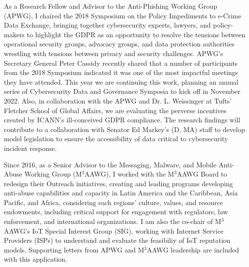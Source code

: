\documentclass[11pt]{letter}
\begin{document}
\begin{letter}
%
%
As a Research Fellow and Advisor to the Anti-Phishing Working Group (APWG), I chaired the 2018 Symposium on the Policy Impediments to e-Crime Data Exchange, bringing together cybersecurity experts,
lawyers, and policy-makers to highlight the GDPR as an opportunity to resolve the tensions between operational security groups, advocacy groups, and data protection authorities wrestling with tensions between privacy and security challenges.
%
APWG's Secretary General Peter Cassidy recently shared that a number of participants from the 2018 Symposium indicated it was one of the most impactful meetings they have attended.
%
This year we are continuing this work, planning an annual series of Cybersecurity Data and Governance Symposia to kick off in November 2022.
%
Also, in collaboration with the APWG and Dr. L. Weissinger at Tufts' Fletcher School of Global Affairs, we are evaluating the perverse incentives created by ICANN's ill-conceived GDPR compliance.
%
The research findings will contribute to a collaboration with Senator Ed Markey's (D, MA) staff to develop model legislation to ensure the accessibility of data critical to cybersecurity incident response. 

%
Since 2016, as a Senior Advisor to the Messaging, Malware, and Mobile Anti-Abuse Working Group (M$^3$AAWG), I worked with the M$^3$AAWG Board to redesign their Outreach initiatives, creating and leading 
programs developing anti-abuse capabilities and capacity in Latin America and the Caribbean, Asia Pacific, and Africa, considering each regions' culture, values, and resource endowments, including critical support for engagement with regulators, law enforcement, and international organizations.
%
I am also the co-chair of M$^3$AAWG's IoT Special Interest Group (SIG), working with Internet Service Providers (ISPs) to understand and evaluate the feasibiliy of IoT reputation models.
%
Supporting letters from APWG and M$^3$AAWG leadership are included with this application.



\end{letter}
\end{document}
